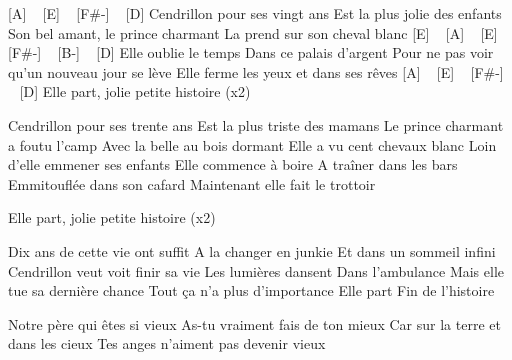 [A] ~ [E] ~ [F#-] ~ [D]
Cendrillon pour ses vingt ans
Est la plus jolie des enfants
Son bel amant, le prince charmant
La prend sur son cheval blanc
[E] ~ [A] ~ [E] ~ [F#-] ~ [B-] ~ [D]
Elle oublie le temps
Dans ce palais d'argent
Pour ne pas voir qu'un nouveau jour se lève
Elle ferme les yeux et dans ses rêves
[A] ~ [E] ~ [F#-] ~ [D]
Elle part, jolie petite histoire (x2)

Cendrillon pour ses trente ans
Est la plus triste des mamans
Le prince charmant a foutu l'camp
Avec la belle au bois dormant
Elle a vu cent chevaux blanc
Loin d'elle emmener ses enfants
Elle commence à boire
A traîner dans les bars
Emmitouflée dans son cafard
Maintenant elle fait le trottoir

Elle part, jolie petite histoire (x2)


Dix ans de cette vie ont suffit
A la changer en junkie
Et dans un sommeil infini
Cendrillon veut voit finir sa vie
Les lumières dansent
Dans l'ambulance
Mais elle tue sa dernière chance
Tout ça n'a plus d'importance
Elle part
Fin de l'histoire

Notre père qui êtes si vieux
As-tu vraiment fais de ton mieux
Car sur la terre et dans les cieux
Tes anges n'aiment pas devenir vieux 